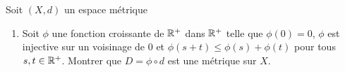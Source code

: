\documentclass[french,a4paper,10pt]{article}
\begin{document}
	\medspace
	\begin{td-exo}
		Soit $(X, d)$ un espace métrique
			\begin{enumerate}
				\item Soit $\phi$ une fonction croissante de $\mathbb{R}^+$ dans $\mathbb{R}^+$ telle que $\phi(0)=0$, $\phi$ est injective sur un voisinage de $0$ et $\phi(s+t)\le\phi(s)+\phi(t)$ pour tous $s,t\in \mathbb{R}^+$. Montrer que $D=\phi\circ d$ est une métrique sur $X$.
			\end{enumerate}
	\end{td-exo}
\end{document}
